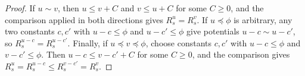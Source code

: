 \begin{proof}
If $u\sim v$, then $u\leq v+C$ and $v\leq u+C$ for some $C\geq0$, and the comparison applied in both directions gives $R_s^u=R_s^v$. If $u\preceq\phi$ is arbitrary, any two constants $c,c'$ with $u-c\leq\phi$ and $u-c'\leq\phi$ give potentials $u-c\sim u-c'$, so $R_s^{u-c}=R_s^{u-c'}$. Finally, if $u\preceq v\preceq\phi$, choose constants $c,c'$ with $u-c\leq\phi$ and $v-c'\leq\phi$. Then $u-c\leq v-c'+C$ for some $C\geq0$, and the comparison gives $R_s^u=R_s^{u-c}\leq R_s^{v-c'}=R_s^v$.
\end{proof}

